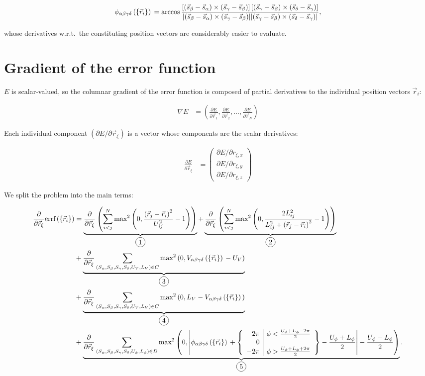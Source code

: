 \documentclass[a4paper]{article}
\newcommand*\circled[1]{
  \tikz[baseline=(char.base)]{
    \node[shape=circle,draw,inner sep=2pt] (char) {#1};
  }
}
\begin{document}
\begin{align}\begin{aligned}
  \phi_{\alpha\beta\gamma\delta}\left(\left\{\vec{r}_i \right\}\right){} = \arccos
    \frac{\left[
      \left(\vec{s}_{\beta}-\vec{s}_{\alpha}\right) \times \left(\vec{s}_{\gamma}-\vec{s}_{\beta}\right)
    \right]\left[
      \left(\vec{s}_{\gamma}-\vec{s}_{\beta}\right) \times \left(\vec{s}_{\delta}-\vec{s}_{\gamma}\right)
    \right]}{\lvert
      \left(\vec{s}_{\beta}-\vec{s}_{\alpha}\right) \times \left(\vec{s}_{\gamma}-\vec{s}_{\beta}\right)
    \rvert\lvert
      \left(\vec{s}_{\gamma}-\vec{s}_{\beta}\right) \times \left(\vec{s}_{\delta}-\vec{s}_{\gamma}\right)
    \rvert
    },
\end{aligned}\end{align}

whose derivatives w.r.t.\ the constituting position vectors are considerably
easier to evaluate.

\newpage

\section{Gradient of the error function}

$E$ is scalar-valued, so the columnar gradient of the error function is
composed of partial derivatives to the individual position vectors $\vec{r}_i$:

\begin{align*}
  \nabla E &= \left(
    \frac{\partial E}{\partial \vec{r}_1},
    \frac{\partial E}{\partial \vec{r}_2},
    \ldots,
    \frac{\partial E}{\partial \vec{r}_N}
  \right)
\end{align*}

Each individual component $\left( \partial E / \partial \vec{r}_\xi \right)$
is a vector whose components are the scalar derivatives:

\begin{align*}
  \frac{\partial E}{\partial \vec{r}_\xi} &= \begin{pmatrix}
    \partial E / \partial r_{\xi , x} \\
    \partial E / \partial r_{\xi , y} \\
    \partial E / \partial r_{\xi , z} 
  \end{pmatrix}
\end{align*}

We split the problem into the main terms:

\begin{align*}
  \partialPosVec{\xi} \errf 
  &= \underbrace{\partialPosVec{\xi} \left(
      \ijNSum \distanceErrorFirstTerm{2}
    \right)
  }_{\circled{1}}
  + \underbrace{\partialPosVec{\xi} \left(
      \ijNSum \distanceErrorSecondTerm{2}
    \right)
  }_{\circled{2}}\\
  &+ \underbrace{\partialPosVec{\xi} \chiralSum \chiralErrorFirstTerm{2}
  }_{\circled{3}}\\
  &+ \underbrace{\partialPosVec{\xi} \chiralSum \chiralErrorSecondTerm{2}
  }_{\circled{4}}\\
  &+ \underbrace{\partialPosVec{\xi} \dihedralSum \dihedralTerm{2}
  }_{\circled{5}}.
\end{align*}
\end{document}

